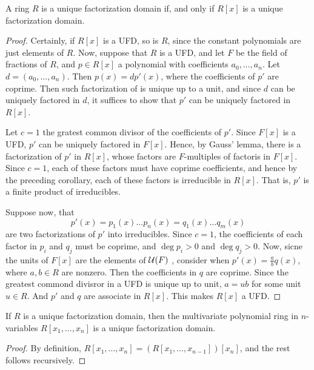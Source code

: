 \begin{theorem}\label{lemma_7.2.2}
  A ring $R$ is a unique factorization domain if, and only if  $R[x]$ is a
  unique factorization domain.
\end{theorem}
\begin{proof}
  Certainly, if $R[x]$ is a UFD, so is $R$, since the constant polynomials
  are just elements of  $R$. Now, suppose that  $R$ is a UFD, and let  $F$ be
  the field of fractions of  $R$, and  $p \in R[x]$ a polynomial with
  coefficients $a_0, \dots, a_n$. Let $d=(a_0, \dots, a_n)$. Then
  $p(x)=dp'(x)$, where the coefficients of $p'$ are coprime. Then such
  factorization of is unique up to a unit, and since $d$ can be uniquely
  factored in  $d$, it suffices to show that  $p'$ can be uniquely factored in
  $R[x]$.

  Let $c=1$ the gratest common divisor of the coefficients of  $p'$. Since
  $F[x]$ is a UFD, $p'$ can be uniquely factored in  $F[x]$. Hence, by
  Gauss' lemma, there is a factorization of $p'$ in  $R[x]$, whose factors
  are $F$-multiples of factoris in  $F[x]$. Since $c=1$, each of these
  factors must have coprime coefficients, and hence by the preceding
  corollary, each of these factors is irreducible in $R[x]$. That is, $p'$ is
  a finite product of irreducibles.

  Suppose now, that
  \begin{equation*}
    p'(x)=p_1(x) \dots p_n(x)=q_1(x) \dots q_m(x)
  \end{equation*}
  are two factorizations of $p'$ into irreducibles. Since  $c=1$, the
  coefficients of each factor in $p_i$ and  $q_j$ must be coprime, and
  $\deg{p_i}>0$ and $\deg{q_j}>0$. Now, sicne the units of $F[x]$ are the
  elements of $\mathcal{U}(F)$ , consider when $p'(x)=\frac{a}{b}q(x)$, where $a,b
  \in R$ are nonzero. Then the coefficients in $q$ are coprime. Since the
  greatest commond divisror in a UFD is unique up to unit,  $a=ub$ for some
  unit  $u \in R$. And  $p'$ and $q$ are associate in $R[x]$. This makes
  $R[x]$ a UFD.
\end{proof}
\begin{corollary}
  If $R$ is a unique factorization domain, then the multivariate polynomial
  ring in  $n$-variables  $R[x_1, \dots, x_n]$ is a unique factorization
  domain.
\end{corollary}
\begin{proof}
  By definition, $R[x_1, \dots, x_n]=(R[x_1, \dots, x_{n-1}])[x_n]$, and the
  rest follows recursively.
\end{proof}

